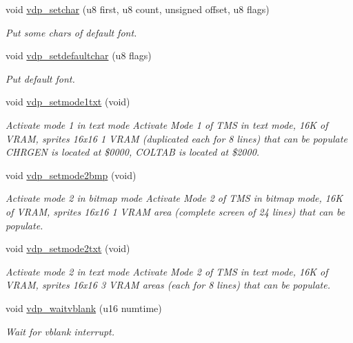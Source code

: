 \begin{DoxyCompactItemize}
void \hyperlink{a00053_ac70a5cddd82471f4d7ca9b84d8a58760}{vdp\+\_\+setchar} (u8 first, u8 count, unsigned offset, u8 flags)
\begin{DoxyCompactList}\small\item\em Put some chars of default font. \end{DoxyCompactList}\item 
void \hyperlink{a00053_a56edf716a6be2b5850249d24861fc845}{vdp\+\_\+setdefaultchar} (u8 flags)
\begin{DoxyCompactList}\small\item\em Put default font. \end{DoxyCompactList}\item 
\mbox{\label{a00053_a29716781cc1ede1b6958c0a329c245ea}} 
void \hyperlink{a00053_a29716781cc1ede1b6958c0a329c245ea}{vdp\+\_\+setmode1txt} (void)
\begin{DoxyCompactList}\small\item\em Activate mode 1 in text mode Activate Mode 1 of T\+MS in text mode, 16K of V\+R\+AM, sprites 16x16 1 V\+R\+AM (duplicated each for 8 lines) that can be populate C\+H\+R\+G\+EN is located at \$0000, C\+O\+L\+T\+AB is located at \$2000. \end{DoxyCompactList}\item 
\mbox{\label{a00053_a508aaacd078ecdecf5883795c04bc40c}} 
void \hyperlink{a00053_a508aaacd078ecdecf5883795c04bc40c}{vdp\+\_\+setmode2bmp} (void)
\begin{DoxyCompactList}\small\item\em Activate mode 2 in bitmap mode Activate Mode 2 of T\+MS in bitmap mode, 16K of V\+R\+AM, sprites 16x16 1 V\+R\+AM area (complete screen of 24 lines) that can be populate. \end{DoxyCompactList}\item 
\mbox{\label{a00053_a82f80697be61ae9fc4651379b907190a}} 
void \hyperlink{a00053_a82f80697be61ae9fc4651379b907190a}{vdp\+\_\+setmode2txt} (void)
\begin{DoxyCompactList}\small\item\em Activate mode 2 in text mode Activate Mode 2 of T\+MS in text mode, 16K of V\+R\+AM, sprites 16x16 3 V\+R\+AM areas (each for 8 lines) that can be populate. \end{DoxyCompactList}\item 
void \hyperlink{a00053_a83dfd82e385330c883c67c30137f9857}{vdp\+\_\+waitvblank} (u16 numtime)
\begin{DoxyCompactList}\small\item\em Wait for vblank interrupt. \end{DoxyCompactList}\end{DoxyCompactItemize}


